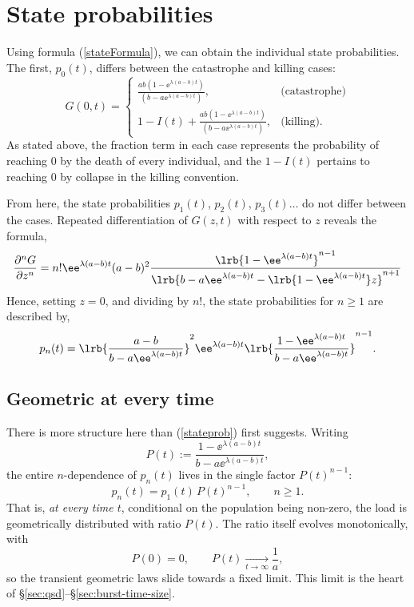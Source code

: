 \section{State probabilities}
\label{sec:state-probs}

Using formula (\ref{stateFormula}), we can obtain the individual state
probabilities. The first, $p_0(t)$, differs between the catastrophe and
killing cases:
$$G(0 , t) = \begin{cases}
\frac{ab(1-\ee^{\lambda(a-b) t})  } {  (b-a\ee^{\lambda(a-b) t})   }, & \text{(catastrophe)}\\
1 - I(t) + \frac{ab(1-\ee^{\lambda(a-b) t})  } {  (b-a\ee^{\lambda(a-b) t})   }, & \text{(killing).}
\end{cases}$$
As stated above, the fraction term in each case represents the probability
of reaching $0$ by the death of every individual, and the $1-I(t)$ pertains
to reaching $0$ by collapse in the killing convention. \par
From here, the state probabilities $p_1(t)$, $p_2(t)$, $p_3(t)\dots$ do not
differ between the cases. Repeated differentiation of $G(z,t)$ with respect
to $z$ reveals the formula,
$$\frac{\partial^n G}{\partial z^n} =n! \ee^{\lambda(a-b)t}(a-b)^2  \frac{\lrb{1-\ee^{\lambda(a-b)t}}^ {n-1} }{\lrb{b - a\ee^{\lambda(a-b)t} - \lrb{1-\ee^{\lambda(a-b)t}}z} ^ {n+1}} $$
Hence, setting $z=0$, and dividing by $n!$, the state probabilities for
$n\geq1$ are described by,
\begin{equation}
\label{stateprob}
p_n(t) =\lrb{ \frac{ a-b }{{b - a\ee^{\lambda(a-b)t}}}}^2 \ee^{\lambda(a-b)t} \lrb{\frac{{1-\ee^{\lambda(a-b)t}}}{{b - a\ee^{\lambda(a-b)t}} } }^{n-1}.
\end{equation}

\subsection{Geometric at every time}
\label{sec:geometric-every-time}

There is more structure here than (\ref{stateprob}) first suggests. Writing
\begin{equation}
P(t):=\frac{1-\ee^{\lambda(a-b)t}}{b-a\ee^{\lambda(a-b)t}},
\label{eq:Pdef}
\end{equation}
the entire $n$-dependence of $p_n(t)$ lives in the single factor
$P(t)^{n-1}$:
\begin{equation}
p_n(t)=p_1(t)\,P(t)^{n-1},\qquad n\ge1.
\end{equation}
That is, \emph{at every time $t$}, conditional on the population being
non-zero, the load is geometrically distributed with ratio $P(t)$. The ratio
itself evolves monotonically, with
\begin{equation}
P(0)=0,\qquad P(t)\xrightarrow[t\to\infty]{}\frac{1}{a},
\end{equation}
so the transient geometric laws slide towards a fixed limit. This limit is
the heart of \S\ref{sec:qsd}--\S\ref{sec:burst-time-size}.

